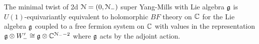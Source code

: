 \documentclass[10pt, oneside]{article}
\begin{document}


\begin{thm} \label{4d_2_minimal_twist_thm}
The minimal twist of 2d $\mathcal N=(0,\mathcal N_-)$ super Yang-Mills with Lie algebra $\mathfrak g$ is $U(1)$-equivariantly equivalent to holomorphic $BF$ theory on $\mathbb C$ for the Lie algebra $\mathfrak g$ coupled to a free fermion system on $\mathbb C$ with values in the representation $\mathfrak g \otimes W_-' \cong \mathfrak g \otimes \mathbb C^{\mathcal N_- - 2}$ where $\mathfrak g$ acts by the adjoint action. 
\end{thm}
\end{document}
